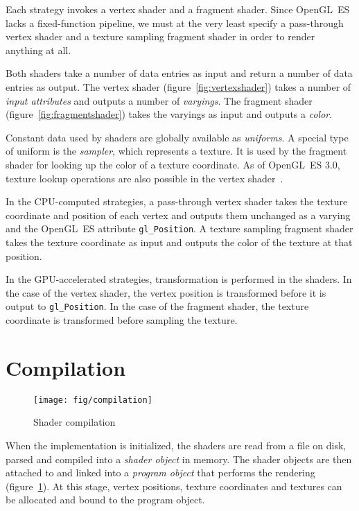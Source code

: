 \documentclass[english,12pt]{ifimaster}
\begin{document}
Each strategy invokes a vertex shader and a fragment shader. Since
OpenGL~ES lacks a fixed-function pipeline, we must at the very least
specify a pass-through vertex shader and a texture sampling fragment
shader in order to render anything at all.

Both shaders take a number of data entries as input and return a
number of data entries as output. The vertex shader
(figure~\ref{fig:vertexshader}) takes a number of \emph{input
  attributes} and outputs a number of \emph{varyings}. The fragment
shader (figure~\ref{fig:fragmentshader}) takes the varyings as input
and outputs a \emph{color}.

Constant data used by shaders are globally available as
\emph{uniforms}. A special type of uniform is the \emph{sampler},
which represents a texture. It is used by the fragment shader for
looking up the color of a texture coordinate. As of OpenGL~ES 3.0,
texture lookup operations are also possible in the vertex
shader~\citep{aaftab14:-opengl-es}.

In the CPU-computed strategies, a pass-through vertex shader takes the
texture coordinate and position of each vertex and outputs them
unchanged as a varying and the OpenGL~ES attribute
\lstinline|gl_Position|. A texture sampling fragment shader takes the
texture coordinate as input and outputs the color of the texture at
that position.

In the GPU-accelerated strategies, transformation is performed in the
shaders. In the case of the vertex shader, the vertex position is
transformed before it is output to \lstinline|gl_Position|. In the
case of the fragment shader, the texture coordinate is transformed
before sampling the texture.


\section{Compilation}

\begin{figure}[b]
  \centering
  \texttt{[image: fig/compilation]}
  \caption{Shader compilation}
  \label{fig:compilation}
\end{figure}

When the implementation is initialized, the shaders are read from a
file on disk, parsed and compiled into a \emph{shader object} in
memory. The shader objects are then attached to and linked into a
\emph{program object} that performs the rendering
(figure~\ref{fig:compilation}). At this stage, vertex positions,
texture coordinates and textures can be allocated and bound to the
program object.
\end{document}
